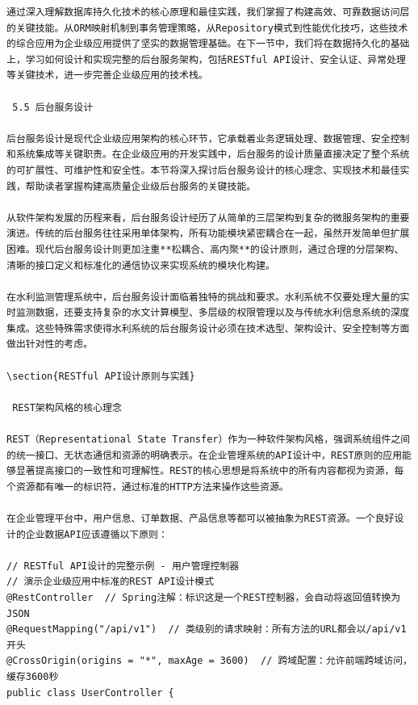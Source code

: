 \begin{lstlisting}
通过深入理解数据库持久化技术的核心原理和最佳实践，我们掌握了构建高效、可靠数据访问层的关键技能。从ORM映射机制到事务管理策略，从Repository模式到性能优化技巧，这些技术的综合应用为企业级应用提供了坚实的数据管理基础。在下一节中，我们将在数据持久化的基础上，学习如何设计和实现完整的后台服务架构，包括RESTful API设计、安全认证、异常处理等关键技术，进一步完善企业级应用的技术栈。

 5.5 后台服务设计

后台服务设计是现代企业级应用架构的核心环节，它承载着业务逻辑处理、数据管理、安全控制和系统集成等关键职责。在企业级应用的开发实践中，后台服务的设计质量直接决定了整个系统的可扩展性、可维护性和安全性。本节将深入探讨后台服务设计的核心理念、实现技术和最佳实践，帮助读者掌握构建高质量企业级后台服务的关键技能。

从软件架构发展的历程来看，后台服务设计经历了从简单的三层架构到复杂的微服务架构的重要演进。传统的后台服务往往采用单体架构，所有功能模块紧密耦合在一起，虽然开发简单但扩展困难。现代后台服务设计则更加注重**松耦合、高内聚**的设计原则，通过合理的分层架构、清晰的接口定义和标准化的通信协议来实现系统的模块化构建。

在水利监测管理系统中，后台服务设计面临着独特的挑战和要求。水利系统不仅要处理大量的实时监测数据，还要支持复杂的水文计算模型、多层级的权限管理以及与传统水利信息系统的深度集成。这些特殊需求使得水利系统的后台服务设计必须在技术选型、架构设计、安全控制等方面做出针对性的考虑。

\section{RESTful API设计原则与实践}

 REST架构风格的核心理念

REST（Representational State Transfer）作为一种软件架构风格，强调系统组件之间的统一接口、无状态通信和资源的明确表示。在企业管理系统的API设计中，REST原则的应用能够显著提高接口的一致性和可理解性。REST的核心思想是将系统中的所有内容都视为资源，每个资源都有唯一的标识符，通过标准的HTTP方法来操作这些资源。

在企业管理平台中，用户信息、订单数据、产品信息等都可以被抽象为REST资源。一个良好设计的企业数据API应该遵循以下原则：

// RESTful API设计的完整示例 - 用户管理控制器
// 演示企业级应用中标准的REST API设计模式
@RestController  // Spring注解：标识这是一个REST控制器，会自动将返回值转换为JSON
@RequestMapping("/api/v1")  // 类级别的请求映射：所有方法的URL都会以/api/v1开头
@CrossOrigin(origins = "*", maxAge = 3600)  // 跨域配置：允许前端跨域访问，缓存3600秒
public class UserController {
    

\end{lstlisting}
